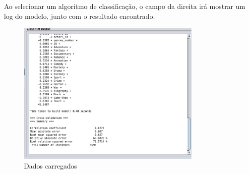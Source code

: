Ao selecionar um algoritmo de classificação, o campo da direita irá mostrar um log do modelo, junto com o resultado encontrado.
\begin{figure}[H]
\centering
\includegraphics[height=7cm]{imagens/wekauotput.png}
\caption{Dados carregados}
\label{figura23}
\end{figure}
